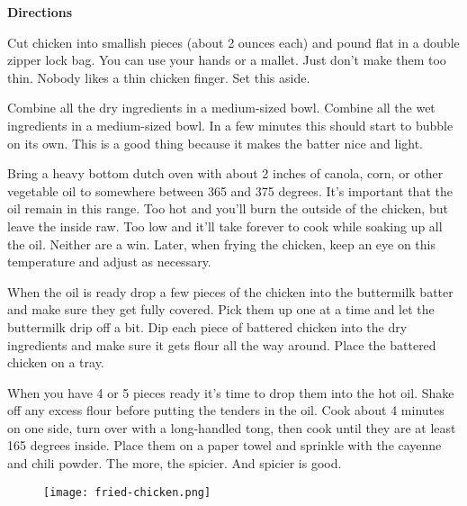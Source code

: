 \documentclass{article}
\begin{document}
\textbf{Directions}

Cut chicken into smallish pieces (about 2 ounces each) and pound flat in a double zipper lock bag. You can
use your hands or a mallet. Just don't make them too thin. Nobody likes a thin chicken finger. Set this aside.

Combine all the dry ingredients in a medium-sized bowl. Combine all the wet ingredients in a medium-sized bowl. In a few minutes this should start to bubble on its own. This
is a good thing because it makes the batter nice and light.

Bring a heavy bottom dutch oven with about 2 inches of canola, corn, or other vegetable oil to somewhere between
365 and 375 degrees. It's important that the oil remain in this range. Too hot and you'll burn the outside of the
chicken, but leave the inside raw. Too low and it'll take forever to cook while soaking up all the oil. Neither
are a win. Later, when frying the chicken, keep an eye on this temperature and adjust as necessary.

When the oil is ready drop a few pieces of the chicken into the buttermilk batter and make sure they get fully
covered. Pick them up one at a time and let the buttermilk drip off a bit. Dip each piece of battered chicken into
the dry ingredients and make sure it gets flour all the way around. Place the battered chicken on a tray.

When you have 4 or 5 pieces ready it's time to drop them into the hot oil. Shake off any excess flour before putting
the tenders in the oil. Cook about 4 minutes on one side, turn over with a long-handled tong, then cook until they are
at least 165 degrees inside. Place them on a paper towel and sprinkle with the cayenne and chili powder. The more, the
spicier. And spicier is good.

\begin{figure}
    \centering
    \texttt{[image: fried-chicken.png]}
\end{figure}
\end{document}
